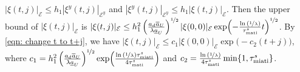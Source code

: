  $|\xi(t,j)|_{\mathcal{E}} \leq h_1 |\xi^y(t,j)|_{\mathcal{E}^y} $ and $|\xi^y(t,j)|_{\mathcal{E}^y} \leq h_1 |\xi(t,j)|_{\mathcal{E}} $. Then the upper bound of $|\xi(t,j)|_{\mathcal{E}} $ is
 $
 |\xi(t,j)|_{\mathcal{E}} \leq h_1^2 \left(\tfrac{a_d \overline{a}_U}{\lambda \underline{a}_U} \right)^{\nicefrac{1}{2}}  |\xi(0,0)|_{\mathcal{E}}  \exp \!\left(-\tfrac{\ln{(\nicefrac{1}{\lambda})}}{ \tau_{\text{mati}}^s}t \right)^{\nicefrac{1}{2}}
 $.
By \eqref{eqn: change t to t+j}, we have 
$
|\xi(t,j)|_{\mathcal{E}} \leq c_1 |\xi(0,0)|_{\mathcal{E}}\exp \! \big(- c_2 (t+j)\big)
$,
where $c_1 = h_1^2 \left(\tfrac{a_d \overline{a}_U}{\lambda \underline{a}_U} \right)^{\nicefrac{1}{2}} \exp \!\left( \tfrac{\ln{(\nicefrac{1}{\lambda})}\tau_{\text{miati}}^s}{4 \tau_{\text{mati}}^s}\right)$ and $c_2 = \tfrac{\ln{(\nicefrac{1}{\lambda})}}{4 \tau_{\text{mati}}^s}  \min\{1,\tau_{\text{miati}}^s \}$.
